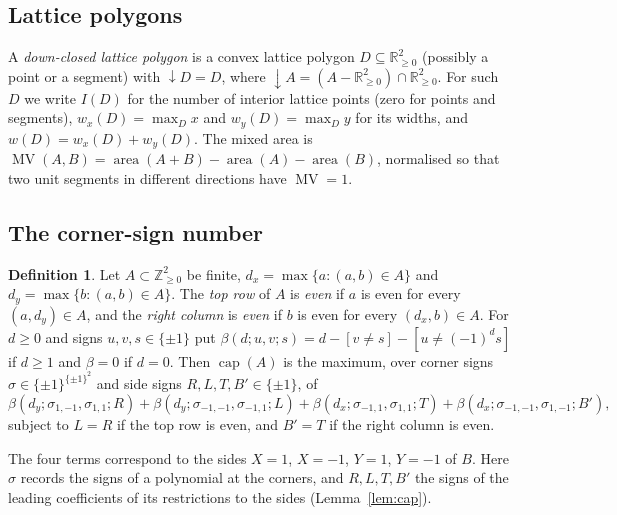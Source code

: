 \documentclass[11pt]{amsart}
\theoremstyle{definition}
\newtheorem{definition}[theorem]{Definition}
\theoremstyle{remark}
\newcommand{\R}{\mathbb{R}}
\newcommand{\Z}{\mathbb{Z}}
\newcommand{\MV}{\operatorname{MV}}
\newcommand{\capn}{\operatorname{cap}}
\newcommand{\down}{{\downarrow}}
\numberwithin{equation}{section}
\begin{document}
\subsection{Lattice polygons}
A \emph{down-closed lattice polygon} is a convex lattice polygon $D\subseteq\R_{\ge0}^2$
(possibly a point or a segment) with $\down D=D$, where
$\down A=(A-\R^2_{\ge0})\cap\R^2_{\ge0}$. For such $D$ we write $I(D)$ for the number of
interior lattice points (zero for points and segments), $w_x(D)=\max_Dx$ and
$w_y(D)=\max_Dy$ for its widths, and $w(D)=w_x(D)+w_y(D)$. The mixed area is
$\MV(A,B)=\operatorname{area}(A+B)-\operatorname{area}(A)-\operatorname{area}(B)$,
normalised so that two unit segments in different directions have $\MV=1$.

\subsection{The corner-sign number}
\begin{definition}\label{def:cap}
Let $A\subset\Z_{\ge0}^2$ be finite, $d_x=\max\{a:(a,b)\in A\}$ and
$d_y=\max\{b:(a,b)\in A\}$. The \emph{top row} of $A$ is \emph{even} if $a$ is even for every
$(a,d_y)\in A$, and the \emph{right column} is \emph{even} if $b$ is even for every
$(d_x,b)\in A$. For $d\ge0$ and signs $u,v,s\in\{\pm1\}$ put
$\beta(d;u,v;s)=d-[v\ne s]-[u\ne(-1)^ds]$ if $d\ge1$ and $\beta=0$ if $d=0$. Then
$\capn(A)$ is the maximum, over corner signs $\sigma\in\{\pm1\}^{\{\pm1\}^2}$ and side signs
$R,L,T,B'\in\{\pm1\}$, of
\[
\beta(d_y;\sigma_{1,-1},\sigma_{1,1};R)+\beta(d_y;\sigma_{-1,-1},\sigma_{-1,1};L)
+\beta(d_x;\sigma_{-1,1},\sigma_{1,1};T)+\beta(d_x;\sigma_{-1,-1},\sigma_{1,-1};B'),
\]
subject to $L=R$ if the top row is even, and $B'=T$ if the right column is even.
\end{definition}

The four terms correspond to the sides $X=1$, $X=-1$, $Y=1$, $Y=-1$ of $B$. Here $\sigma$ records
the signs of a polynomial at the corners, and $R,L,T,B'$ the signs of the leading
coefficients of its restrictions to the sides (Lemma~\ref{lem:cap}).
\end{document}
